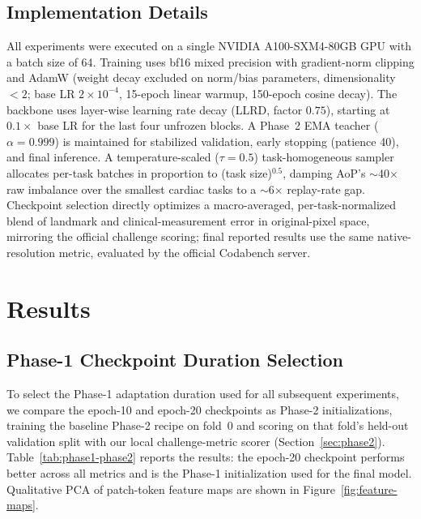 \documentclass[runningheads]{llncs}
\begin{document}
\subsection{Implementation Details}
All experiments were executed on a single NVIDIA A100-SXM4-80GB GPU with a batch size of 64. Training uses bf16 mixed precision with gradient-norm clipping and AdamW (weight decay excluded on norm/bias parameters, dimensionality $<2$; base LR $2\times10^{-4}$, 15-epoch linear warmup, 150-epoch cosine decay). The backbone uses layer-wise learning rate decay (LLRD, factor $0.75$), starting at $0.1\times$ base LR for the last four unfrozen blocks. A Phase~2 EMA teacher ($\alpha=0.999$) is maintained for stabilized validation, early stopping (patience 40), and final inference. A temperature-scaled ($\tau=0.5$) task-homogeneous sampler allocates per-task batches in proportion to (task size)$^{0.5}$, damping AoP's $\sim$40$\times$ raw imbalance over the smallest cardiac tasks to a $\sim$6$\times$ replay-rate gap. Checkpoint selection directly optimizes a macro-averaged, per-task-normalized blend of landmark and clinical-measurement error in original-pixel space, mirroring the official challenge scoring; final reported results use the same native-resolution metric, evaluated by the official Codabench server.


\section{Results}


\subsection{Phase-1 Checkpoint Duration Selection}
\label{sec:ssl-duration}
To select the Phase-1 adaptation duration used for all subsequent experiments, we compare the epoch-10 and epoch-20 checkpoints as Phase-2 initializations, training the baseline Phase-2 recipe on fold~0 and scoring on that fold's held-out validation split with our local challenge-metric scorer (Section~\ref{sec:phase2}). Table~\ref{tab:phase1-phase2} reports the results: the epoch-20 checkpoint performs better across all metrics and is the Phase-1 initialization used for the final model. Qualitative PCA of patch-token feature maps are shown in Figure~\ref{fig:feature-maps}.
\end{document}
